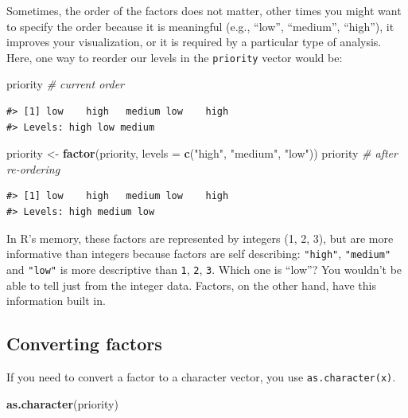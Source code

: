 \documentclass[
]{book}
\newenvironment{Shaded}{\begin{snugshade}}{\end{snugshade}}
\newcommand{\AttributeTok}[1]{\textcolor[rgb]{0.13,0.29,0.53}{#1}}
\newcommand{\CommentTok}[1]{\textcolor[rgb]{0.56,0.35,0.01}{\textit{#1}}}
\newcommand{\FunctionTok}[1]{\textcolor[rgb]{0.13,0.29,0.53}{\textbf{#1}}}
\newcommand{\NormalTok}[1]{#1}
\newcommand{\OtherTok}[1]{\textcolor[rgb]{0.56,0.35,0.01}{#1}}
\newcommand{\StringTok}[1]{\textcolor[rgb]{0.31,0.60,0.02}{#1}}
\begin{document}
Sometimes, the order of the factors does not matter, other times you might want
to specify the order because it is meaningful (e.g., ``low'', ``medium'', ``high''),
it improves your visualization, or it is required by a particular type of
analysis. Here, one way to reorder our levels in the \texttt{priority} vector would be:

\begin{Shaded}
\begin{Highlighting}[]
\NormalTok{priority }\CommentTok{\# current order}
\end{Highlighting}
\end{Shaded}

\begin{verbatim}
#> [1] low    high   medium low    high  
#> Levels: high low medium
\end{verbatim}

\begin{Shaded}
\begin{Highlighting}[]
\NormalTok{priority }\OtherTok{\textless{}{-}} \FunctionTok{factor}\NormalTok{(priority, }\AttributeTok{levels =} \FunctionTok{c}\NormalTok{(}\StringTok{"high"}\NormalTok{, }\StringTok{"medium"}\NormalTok{, }\StringTok{"low"}\NormalTok{))}
\NormalTok{priority }\CommentTok{\# after re{-}ordering}
\end{Highlighting}
\end{Shaded}

\begin{verbatim}
#> [1] low    high   medium low    high  
#> Levels: high medium low
\end{verbatim}

In R's memory, these factors are represented by integers (1, 2, 3), but are more
informative than integers because factors are self describing: \texttt{"high"},
\texttt{"medium"} and \texttt{"low"} is more descriptive than \texttt{1}, \texttt{2}, \texttt{3}. Which one is ``low''? You wouldn't
be able to tell just from the integer data. Factors, on the other hand, have
this information built in.

\subsection{Converting factors}\label{converting-factors}

If you need to convert a factor to a character vector, you use
\texttt{as.character(x)}.

\begin{Shaded}
\begin{Highlighting}[]
\FunctionTok{as.character}\NormalTok{(priority)}
\end{Highlighting}
\end{Shaded}
\end{document}
